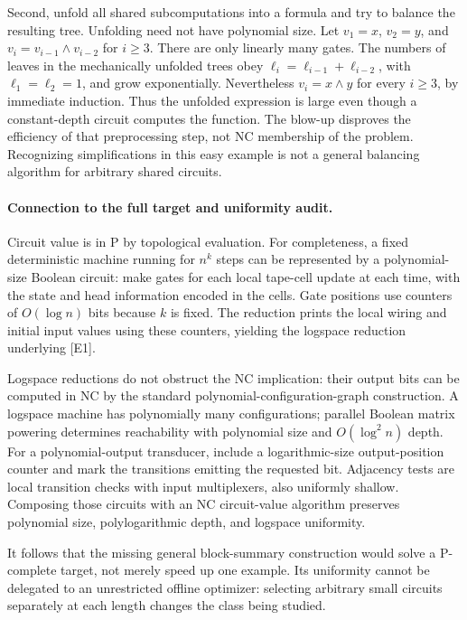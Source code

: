 \documentclass[11pt]{article}
\begin{document}
Second, unfold all shared subcomputations into a formula and try to balance
the resulting tree. Unfolding need not have polynomial size. Let
$v_1=x$, $v_2=y$, and $v_i=v_{i-1}\wedge v_{i-2}$ for $i\ge3$.
There are only linearly many gates. The numbers of leaves in the mechanically
unfolded trees obey $\ell_i=\ell_{i-1}+\ell_{i-2}$, with
$\ell_1=\ell_2=1$, and grow exponentially. Nevertheless $v_i=x\wedge y$
for every $i\ge3$, by immediate induction. Thus the unfolded expression is
large even though a constant-depth circuit computes the function.
The blow-up disproves the efficiency of that preprocessing step, not NC
membership of the problem. Recognizing simplifications in this easy example
is not a general balancing algorithm for arbitrary shared circuits.

\paragraph{Connection to the full target and uniformity audit.}
Circuit value is in P by topological evaluation. For completeness, a fixed
deterministic machine running for $n^k$ steps can be represented by a
polynomial-size Boolean circuit: make gates for each local tape-cell update
at each time, with the state and head information encoded in the cells.
Gate positions use counters of $O(\log n)$ bits because $k$ is fixed.
The reduction prints the local wiring and initial input values using these
counters, yielding the logspace reduction underlying [E1].

Logspace reductions do not obstruct the NC implication: their output bits
can be computed in NC by the standard polynomial-configuration-graph
construction. A logspace machine has polynomially many configurations;
parallel Boolean matrix powering determines reachability with polynomial
size and $O(\log^2 n)$ depth. For a polynomial-output transducer, include a
logarithmic-size output-position counter and mark the transitions emitting
the requested bit. Adjacency tests are local transition checks with input
multiplexers, also uniformly shallow. Composing those circuits with an NC
circuit-value algorithm preserves polynomial size, polylogarithmic depth,
and logspace uniformity.

It follows that the missing general block-summary construction would solve
a P-complete target, not merely speed up one example. Its uniformity cannot
be delegated to an unrestricted offline optimizer: selecting arbitrary small
circuits separately at each length changes the class being studied.
\end{document}

